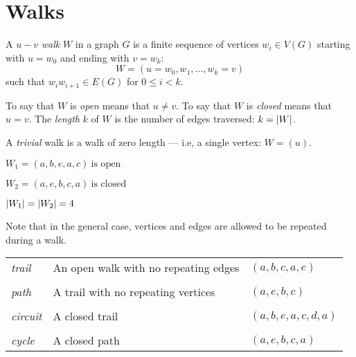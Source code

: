 \documentclass[letterpaper,12pt,fleqn]{article}
\begin{document}
\section*{Walks}

\begin{definition}[Walk]
  A \(u-v\) \emph{walk} \(W\) in a graph \(G\) is a finite sequence of vertices \(w_i\in V(G)\) starting with
  \(u=w_0\) and ending with \(v=w_k\):
  \[W=(u=w_0,w_1,\ldots,w_k=v)\]
  such that \(w_iw_{i+1}\in E(G)\) for \(0\le i<k\).

  To say that \(W\) is \emph{open} means that \(u\ne v\).  To say that \(W\) is \emph{closed} means that \(u=v\).
  The \emph{length} \(k\) of \(W\) is the number of edges traversed: \(k=\lvert W\rvert\).

  A \emph{trivial} walk is a walk of zero length --- i.e, a single vertex: \(W=(u)\).
\end{definition}

\begin{example}
  \begin{minipage}{3in}
    \begin{center}
    \end{center}
  \end{minipage}
  \begin{minipage}{3in}
    \(W_1=(a,b,e,a,c)\ \text{is open}\)

    \(W_2=(a,e,b,c,a)\ \text{is closed}\)

    \bigskip

    \(\lvert W_1\rvert=\lvert W_2\rvert=4\)
  \end{minipage}
\end{example}

Note that in the general case, vertices and edges are allowed to be repeated during a walk.

\begin{definition}
  \begin{tabular}{lll}
    \emph{trail} & An open walk with no repeating edges & \((a,b,c,a,e)\) \\
    \\
    \emph{path} & A trail with no repeating vertices & \((a,e,b,c)\) \\
    \\
    \emph{circuit} & A closed trail & \((a,b,e,a,c,d,a)\) \\
    \\
    \emph{cycle} & A closed path & \((a,e,b,c,a)\)
  \end{tabular}
\end{definition}
\end{document}

